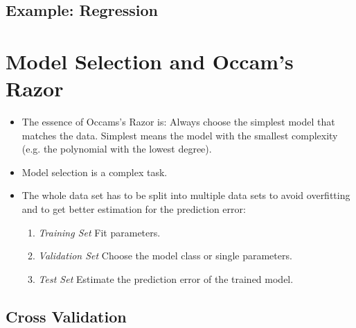 		\subsection{Example: Regression} %

	\section{Model Selection and Occam's Razor}
		\label{sec:validation}

		\begin{itemize}
			\item The essence of Occams's Razor is: Always choose the simplest model that matches the data. Simplest means the model with the smallest complexity (e.g. the polynomial with the lowest degree).
			\item Model selection is a complex task.
			\item The whole data set has to be split into multiple data sets to avoid overfitting and to get better estimation for the prediction error:
				\begin{enumerate}
					\item \emph{Training Set}   \tabto{3cm} Fit parameters.
					\item \emph{Validation Set} \tabto{3cm} Choose the model class or single parameters.
					\item \emph{Test Set}       \tabto{3cm} Estimate the prediction error of the trained model.
				\end{enumerate}
		\end{itemize}

		\subsection{Cross Validation}
			\label{sec:crossvalidation}

